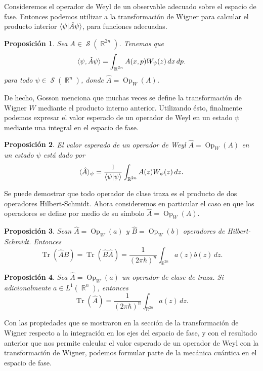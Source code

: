 \documentclass[a4paper]{report}
\DeclareMathOperator{\R}{\mathbb{R}}
\DeclareMathOperator{\Sz}{\mathcal S}
\DeclareMathOperator{\Tr}{Tr}
\DeclareMathOperator{\Op}{Op}
\newtheorem{proposition}{Proposición}
\begin{document}
  Consideremos el operador de Weyl de un observable adecuado
  sobre el espacio de fase. Entonces podemos utilizar a la
  transformación de Wigner para calcular el producto
  interior $\braket{\psi|\hat{A}\psi}$, para funciones
  adecuadas.
  \begin{proposition}
    \label{prop:wigner-weyl}
    Sea $A \in \Sz(\R^{2n})$. Tenemos que
    \begin{equation}
      \braket{\psi, \hat{A}\psi}
      = \int_{\R^{2n}} A(x,p)W_\psi(z) \, dx \, dp.
    \end{equation}
    para todo $\psi \in \Sz(\R^{n})$, donde $\hat{A} =
    \Op_W(A)$.
  \end{proposition}
  De hecho, Gosson menciona que muchas veces se define la
  transformación de Wigner $W$ mediante el producto interno
  anterior. Utilizando ésto, finalmente podemos expresar el
  valor esperado de un operador de Weyl en un estado $\psi$
  mediante una integral en el espacio de fase.
  \begin{proposition}
    El valor esperado de un operador de Weyl $\hat{A} =
    \Op_W(A)$ en un estado $\psi$ está dado por
    \begin{equation}
      \langle \hat{A} \rangle_\psi
      = \frac{1}{\braket{\psi|\psi}} 
      \int_{\R^{2n}} A(z) W_\psi(z) \, dz.
    \end{equation}
  \end{proposition}  

  Se puede demostrar que todo operador de clase traza es el
  producto de dos operadores Hilbert-Schmidt. Ahora
  consideremos en particular el caso en que los operadores
  se define por medio de su símbolo $\hat{A} = \Op_W(A)$.
  \begin{proposition}
    Sean $\hat{A} = \Op_W(a)$ y $\hat{B} = \Op_W(b)$
    operadores de Hilbert-Schmidt. Entonces
    \begin{equation}
      \Tr\left( \hat{A}\hat{B} \right) 
      = \Tr\left( \hat{B}\hat{A} \right) 
      = \frac{1}{(2\pi\hbar)^{n}} \int_{\R^{2n}} a(z)b(z) \,
      dz.
    \end{equation}
  \end{proposition}
  \begin{proposition}
    Sea $\hat{A} = \Op_W(a)$ un operador de clase de traza.
    Si adicionalmente $a \in L^{1}(\R^{n})$, entonces
    \begin{equation}
      \Tr\left( \hat{A} \right) 
      = \frac{1}{(2\pi\hbar)^{n}} \int_{\R^{2n}} a(z) \, dz.
    \end{equation}
  \end{proposition}
  Con las propiedades que se mostraron en la sección de la
  transformación de Wigner respecto a la integración en los
  ejes del espacio de fase, y con el resultado anterior que
  nos permite calcular el valor esperado de un operador de
  Weyl con la transformación de Wigner, podemos formular
  parte de la mecánica cuántica en el espacio de fase.
\end{document}
